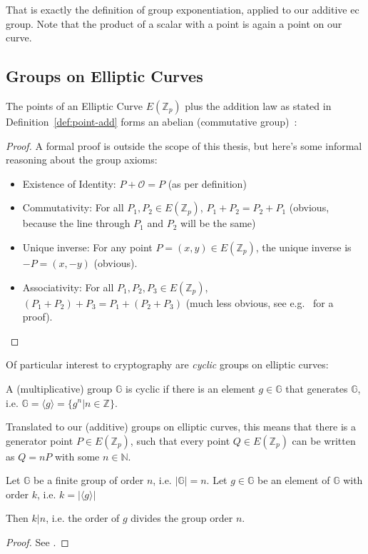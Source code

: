 That is exactly the definition of group exponentiation, applied to our additive \Gls{ec} group. Note that the product of a scalar with a point is again a point on our curve.\\

\subsection{Groups on Elliptic Curves}
\begin{theorem}
    The points of an Elliptic Curve $E(\mathbb{Z}_p)$ plus the addition law as stated in Definition~\ref{def:point-add} forms an abelian (commutative group)~\cite{katz_introduction_2015, washington_elliptic_2008}:
\end{theorem}
\begin{proof}
    A formal proof is outside the scope of this thesis, but here's some informal reasoning about the group axioms:
    \begin{itemize}
        \item Existence of Identity: $P + \mathcal{O} = P$ (as per definition)
        \item Commutativity: For all $P_1, P_2 \in E(\mathbb{Z}_p)$, $P_1 + P_2 = P_2 + P_1$ (obvious, because the line through $P_1$ and $P_2$ will be the same)
        \item Unique inverse: For any point $P = (x,y) \in E(\mathbb{Z}_p)$, the unique inverse is $-P = (x, -y)$ (obvious).
        \item Associativity: For all $P_1, P_2, P_3 \in E(\mathbb{Z}_p)$, $(P_1 + P_2) + P_3 = P_1 + (P_2 + P_3)$ (much less obvious, see e.g.~\cite[Chapter 2.4]{washington_elliptic_2008} for a proof).
    \end{itemize}
\end{proof}

Of particular interest to cryptography are \emph{cyclic} groups on elliptic curves:
\begin{definition}
    A (multiplicative) group $\mathbb{G}$ is cyclic if there is an element $g \in \mathbb{G}$ that generates $\mathbb{G}$, i.e. $\mathbb{G} = \langle g \rangle = \{g^n | n \in \mathbb{Z}\}$.
\end{definition}

Translated to our (additive) groups on elliptic curves, this means that there is a generator point $P \in E(\mathbb{Z}_p)$, such that every point $Q \in E(\mathbb{Z}_p)$ can be written as $Q = nP$ with some $n \in \mathbb{N}$.

\begin{theorem}\cite{katz_introduction_2015}
    Let $\mathbb{G}$ be a finite group of order $n$, i.e. $|\mathbb{G}| = n$.
    Let $g \in \mathbb{G}$ be an element of $\mathbb{G}$ with order $k$, i.e. $k = |\langle g \rangle |$

    Then $k|n$, i.e. the order of $g$ divides the group order $n$.
\end{theorem}
\begin{proof}
    See \cite*[Proposition 8.54]{katz_introduction_2015}.
\end{proof}

